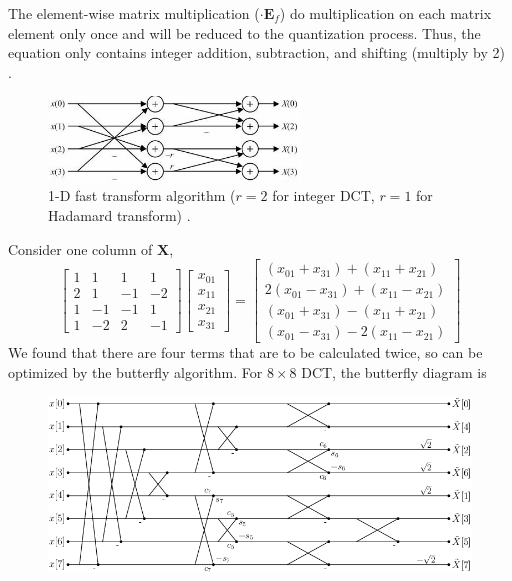 \documentclass[a4paper,12pt,twoside]{article}
\begin{document}
The element-wise matrix multiplication ($\cdot\mathbf{E}_f$) do multiplication on each matrix element only once and will be reduced to the quantization process. Thus, the equation only contains integer addition, subtraction, and shifting (multiply by 2) \cite{h264avc}.
\begin{figure}[H]
    \centering
    \includegraphics[width=0.6\textwidth]{images/24.jpg}
    \caption{1-D fast transform algorithm ($r=2$ for integer DCT, $r=1$ for Hadamard transform) \cite{h264avc}.}
\end{figure}
Consider one column of $\mathbf{X}$,
\begin{equation}
    \begin{bmatrix}
        1&1&1&1\\
        2&1&-1&-2\\
        1&-1&-1&1\\
        1&-2&2&-1
    \end{bmatrix}\begin{bmatrix}
        x_{01}\\
        x_{11}\\
        x_{21}\\
        x_{31}
    \end{bmatrix}=
    \begin{bmatrix}
        (x_{01}+x_{31})+(x_{11}+x_{21})\\
        2(x_{01}-x_{31})+(x_{11}-x_{21})\\
        (x_{01}+x_{31})-(x_{11}+x_{21})\\
        (x_{01}-x_{31})-2(x_{11}-x_{21})
    \end{bmatrix}
\end{equation}
We found that there are four terms that are to be calculated twice, so can be optimized by the butterfly algorithm. For $8\times8$ DCT, the butterfly diagram is \cite{ryg}
\begin{figure}[H]
    \centering
    \includegraphics[width=\textwidth]{images/25.png}
\end{figure}
\end{document}
